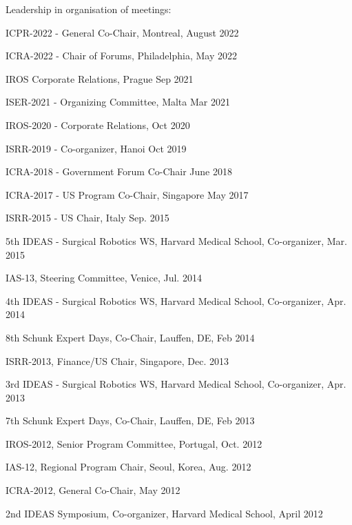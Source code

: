 \documentclass{article}
\begin{document}
\begin{cv}
\begin{cvlist}{Leadership in organisation of meetings:}
\item ICPR-2022 - General Co-Chair, Montreal, \cftdotfill{\cftdotsep}
  August 2022
\item ICRA-2022 - Chair of Forums, Philadelphia, \cftdotfill{\cftdotsep}
  May 2022
\item IROS Corporate Relations, Prague \cftdotfill{\cftdotsep}
  Sep 2021
\item ISER-2021 - Organizing Committee, Malta \cftdotfill{\cftdotsep}
  Mar 2021
\item IROS-2020 - Corporate Relations, \cftdotfill{\cftdotsep}
  Oct 2020
\item ISRR-2019 - Co-organizer, Hanoi \cftdotfill{\cftdotsep}
  Oct 2019
\item ICRA-2018 - Government Forum Co-Chair \cftdotfill{\cftdotsep}
  June 2018
\item ICRA-2017 - US Program Co-Chair, Singapore
  \cftdotfill{\cftdotsep} May 2017
\item ISRR-2015 - US Chair, Italy \cftdotfill{\cftdotsep} Sep. 2015
\item 5th IDEAS - Surgical Robotics WS, Harvard Medical School,
  Co-organizer, \cftdotfill{\cftdotsep} Mar. 2015
\item IAS-13, Steering Committee, Venice, \cftdotfill{\cftdotsep}
  Jul. 2014
\item 4th IDEAS - Surgical Robotics WS, Harvard Medical School,
  Co-organizer, \cftdotfill{\cftdotsep} Apr. 2014
\item 8th Schunk Expert Days, Co-Chair, Lauffen, DE,
  \cftdotfill{\cftdotsep} Feb 2014
\item ISRR-2013, Finance/US Chair, Singapore, \cftdotfill{\cftdotsep}
  Dec. 2013
\item 3rd IDEAS - Surgical Robotics WS, Harvard Medical School,
  Co-organizer, \cftdotfill{\cftdotsep} Apr. 2013
\item 7th Schunk Expert Days, Co-Chair, Lauffen, DE,
  \cftdotfill{\cftdotsep} Feb 2013
\item IROS-2012, Senior Program Committee,
  Portugal,\cftdotfill{\cftdotsep} Oct. 2012
\item IAS-12, Regional Program Chair, Seoul, Korea,
  \cftdotfill{\cftdotsep} Aug. 2012
\item ICRA-2012, General Co-Chair, \cftdotfill{\cftdotsep} May 2012
\item 2nd IDEAS Symposium, Co-organizer, Harvard Medical School,
  \cftdotfill{\cftdotsep} April 2012

\end{cvlist}
\end{cv}
\end{document}
